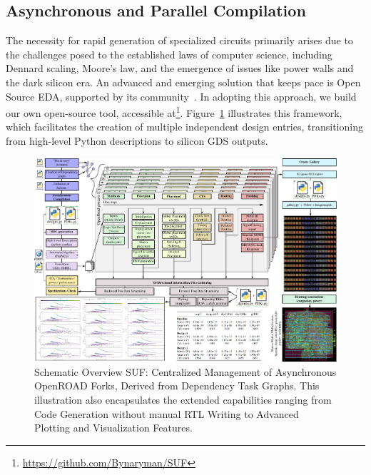 \subsection{Asynchronous and Parallel Compilation}
\label{sec:framework}

The necessity for rapid generation of specialized circuits primarily arises due to the challenges posed to the established laws of computer science, including Dennard scaling, Moore's law, and the emergence of issues like power walls and the dark silicon era.
An advanced and emerging solution that keeps pace is Open Source EDA, supported by its community~\cite{ajayi2019toward}.
In adopting this approach, we build our own open-source tool, accessible at\footnote{\url{https://github.com/Bynaryman/SUF}}.
Figure~\ref{fig:suf} illustrates this framework, which facilitates the creation of multiple independent design entries, transitioning from high-level Python descriptions to silicon GDS outputs.

\begin{figure}[t]
\centering
	\includegraphics[width=0.9\columnwidth]{./figures/SUF.pdf}
	\vspace{-0.5cm}
	\caption{Schematic Overview SUF: Centralized Management of Asynchronous OpenROAD Forks, Derived from Dependency Task Graphs. This illustration also encapsulates the extended capabilities ranging from Code Generation without manual RTL Writing to Advanced Plotting and Visualization Features.}
	\label{fig:suf}
\end{figure}

